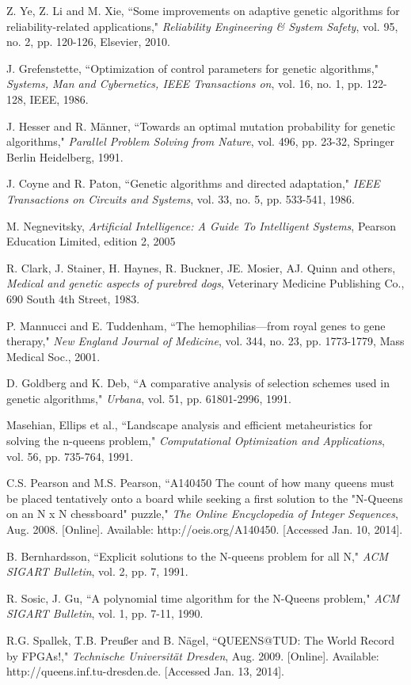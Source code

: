 \documentclass[conference]{IEEEtran}
\begin{document}
\begin{thebibliography}{24}
 Z. Ye, Z. Li and M. Xie, ``Some improvements on adaptive genetic algorithms for reliability-related applications,"
        {\it Reliability Engineering \& System Safety}, vol. 95, no. 2, pp. 120-126, Elsevier, 2010.

 J. Grefenstette, ``Optimization of control parameters for genetic algorithms,"
        {\it Systems, Man and Cybernetics, IEEE Transactions on}, vol. 16, no. 1, pp. 122-128, IEEE, 1986.

 J. Hesser and R. M{\"a}nner, ``Towards an optimal mutation probability for genetic algorithms,"
        {\it Parallel Problem Solving from Nature}, vol. 496, pp. 23-32, Springer Berlin Heidelberg, 1991.

 J. Coyne and R. Paton, ``Genetic algorithms and directed adaptation,"
        {\it IEEE Transactions on Circuits and Systems}, vol. 33, no. 5, pp. 533-541, 1986.

 M. Negnevitsky,
        {\it Artificial Intelligence: A Guide To Intelligent Systems}, Pearson Education Limited, edition 2, 2005


 R. Clark, J. Stainer, H. Haynes, R. Buckner, JE. Mosier, AJ. Quinn and others,
        {\it Medical and genetic aspects of purebred dogs}, Veterinary Medicine Publishing Co., 690 South 4th Street, 1983.


 P. Mannucci and E. Tuddenham, ``The hemophilias—from royal genes to gene therapy,"
        {\it New England Journal of Medicine}, vol. 344, no. 23, pp. 1773-1779, Mass Medical Soc., 2001.

 D. Goldberg and K. Deb, ``A comparative analysis of selection schemes used in genetic algorithms,"
        {\it Urbana}, vol. 51, pp. 61801-2996, 1991.

 Masehian, Ellips et al., ``Landscape analysis and efficient metaheuristics for solving the n-queens problem,"
        {\it Computational Optimization and Applications}, vol. 56, pp. 735-764, 1991.


 C.S. Pearson and M.S. Pearson, ``A140450 The count of how many queens must be placed tentatively onto a board while seeking a first solution to the "N-Queens on an N x N chessboard" puzzle,"
        {\it The Online Encyclopedia of Integer Sequences}, Aug. 2008. [Online]. Available: http://oeis.org/A140450. [Accessed Jan. 10, 2014].
        
 B. Bernhardsson, ``Explicit solutions to the N-queens problem for all N,"
        {\it ACM SIGART Bulletin}, vol. 2, pp. 7, 1991.

 R. Sosic, J. Gu, ``A polynomial time algorithm for the N-Queens problem,"
        {\it ACM SIGART Bulletin}, vol. 1, pp. 7-11, 1990.

 R.G. Spallek, T.B. Preu{\ss}er and B. N{\"a}gel, ``QUEENS@TUD: The World Record by FPGAs!,"
        {\it Technische Universit{\"a}t Dresden}, Aug. 2009. [Online]. Available: http://queens.inf.tu-dresden.de. [Accessed Jan. 13, 2014].

\end{thebibliography}

\end{document}
